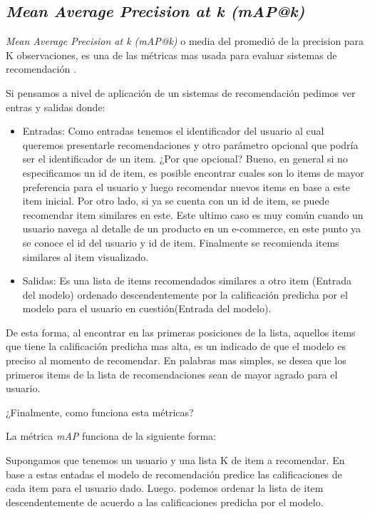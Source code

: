 \documentclass[11pt,a4paper,twoside]{thesis}
\begin{document}
{\subsection{\textit{Mean Average Precision at k (mAP@k)}}

\textit{Mean Average Precision at k (mAP@k)} o media del promedió de la precision para K observaciones, es una de las métricas mas usada para evaluar sistemas de recomendación \cite{map_at_k_1, map_at_k_2, map_at_k_3}.

Si pensamos a nivel de aplicación de un sistemas de recomendación pedimos ver entras y salidas donde:


\begin{itemize}
\item Entradas: Como entradas tenemos el identificador del usuario al cual queremos presentarle recomendaciones y otro parámetro opcional que podría ser el identificador de un item. ¿Por que opcional? Bueno, en general si no especificamos un id de item, es posible encontrar cuales son lo items de mayor preferencia para el usuario y luego recomendar nuevos items en base a este item inicial. Por otro lado, si ya se cuenta con un id de item, se puede recomendar item similares en este. Este ultimo caso es muy común cuando un usuario navega al detalle de un producto en un e-commerce, en este punto ya se conoce el id del usuario y id de item. Finalmente se recomienda items similares al item visualizado.
\item Salidas: Es una lista de items recomendados similares a otro item (Entrada del modelo) ordenado descendentemente por la calificación predicha por el modelo para el usuario en cuestión(Entrada del modelo). 
\end{itemize}


De esta forma, al encontrar en las primeras posiciones de la lista, aquellos items que tiene la calificación predicha mas alta, es un indicado de que el modelo es preciso al momento de recomendar. En palabras mas simples, se desea que los primeros items de la lista de recomendaciones sean de mayor agrado para el usuario.

¿Finalmente, como funciona esta métricas?

La métrica \textit{mAP\makeatletter@k} funciona de la siguiente forma:

Supongamos que tenemos un usuario y una lista K de item a recomendar. En base a estas entadas el modelo de recomendación predice las calificaciones de cada item para el usuario dado. Luego. podemos ordenar la lista de item descendentemente de acuerdo a las calificaciones predicha por el modelo.

}
\end{document}
